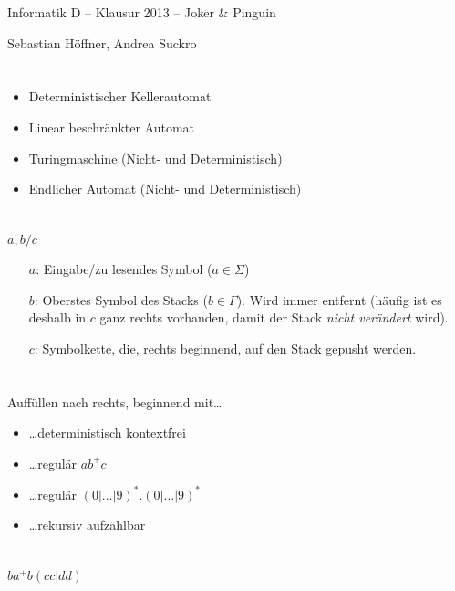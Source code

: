 \documentclass{article}
\begin{document}
\begin{center}
  \Large{Informatik D -- Klausur 2013 -- Joker \& Pinguin}

  \large{Sebastian Höffner, Andrea Suckro}
\end{center}

\section{}%
\begin{itemize}
	\item Deterministischer Kellerautomat
  \item Linear beschränkter Automat
  \item Turingmaschine (Nicht- und Deterministisch)
  \item Endlicher Automat (Nicht- und Deterministisch)
\end{itemize}

\section{}%
$a,b/c$
\begin{enumerate}
	\item[$a$:] Eingabe/zu lesendes Symbol ($a \in \Sigma$)
  \item[$b$:] Oberstes Symbol des Stacks ($b \in \Gamma$). Wird immer entfernt (häufig ist es deshalb in $c$ ganz rechts vorhanden, damit der Stack \emph{nicht verändert} wird).
  \item[$c$:] Symbolkette, die, rechts beginnend, auf den Stack gepusht werden.
\end{enumerate}

\section{}%
Auffüllen nach rechts, beginnend mit\dots
\begin{itemize}
	\item \dots deterministisch kontextfrei
	\item \dots regulär $ab^+c$
	\item \dots regulär $(0|\dots|9)^*.(0|\dots|9)^*$
	\item \dots rekursiv aufzählbar
\end{itemize}

\section{}%
$ba^+b(cc|dd)$
\end{document}
